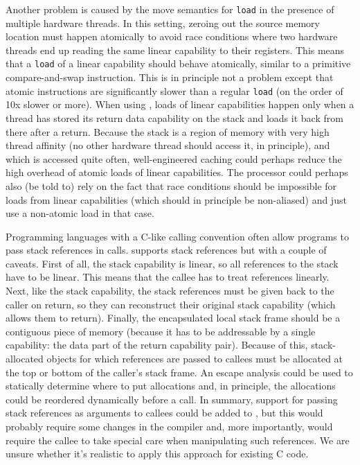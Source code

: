 Another problem is caused by the move semantics for \texttt{load} in the presence of multiple hardware threads.
In this setting, zeroing out the source memory location must happen atomically to avoid race conditions where two hardware threads end up reading the same linear capability to their registers.
This means that a \texttt{load} of a linear capability should behave atomically, similar to a primitive compare-and-swap instruction.
This is in principle not a problem except that atomic instructions are significantly slower than a regular \texttt{load} (on the order of 10x slower or more).
When using \stktokens{}, loads of linear capabilities happen only when a thread has stored its return data capability on the stack and loads it back from there after a return.
Because the stack is a region of memory with very high thread affinity (no other hardware thread should access it, in principle), and which is accessed quite often, well-engineered caching could perhaps reduce the high overhead of atomic loads of linear capabilities.
The processor could perhaps also (be told to) rely on the fact that race conditions should be impossible for loads from linear capabilities (which should in principle be non-aliased) and just use a non-atomic load in that case.


\begin{jversion}
  Programming languages with a C-like calling convention often allow programs to pass stack references in calls.
  \stktokens{} supports stack references but with a couple of caveats.
  First of all, the stack capability is linear, so all references to the stack have to be linear.
  This means that the callee has to treat references linearly.
  Next, like the stack capability, the stack references must be given back to the caller on return, so they can reconstruct their original stack capability (which allows them to return). 
  Finally, the encapsulated local stack frame should be a contiguous piece of memory (because it has to be addressable by a single capability: the data part of the return capability pair).
  Because of this, stack-allocated objects for which references are passed to callees must be allocated at the top or bottom of the caller's stack frame.
  An escape analysis could be used to statically determine where to put allocations and, in principle, the allocations could be reordered dynamically before a call.
  In summary, support for passing stack references as arguments to callees could be added to \stktokens{}, but this would probably require some changes in the compiler and, more importantly, would require the callee to take special care when manipulating such references.
  We are unsure whether it's realistic to apply this approach for existing C code.
\end{jversion}

